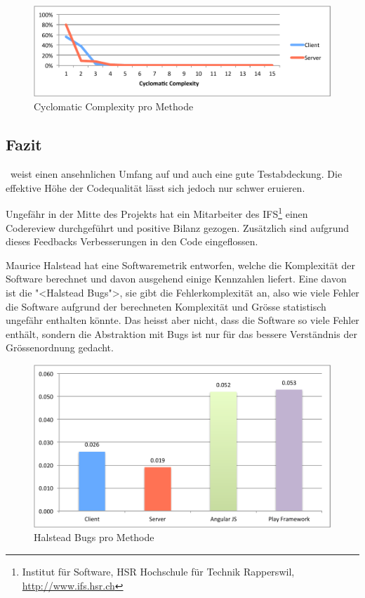 	
	\begin{figure}[H]
		\includegraphics[width=\textwidth]{projectPlan/media/img/methodComplexityCyclomaticComplexity.pdf}
		\centering
		\caption{Cyclomatic Complexity pro Methode}
		\label{fig:methodComplexityCyclomaticComplexity}
	\end{figure}
	
	
	\subsection{Fazit}
		\eeppi\ weist einen ansehnlichen Umfang auf und auch eine gute Testabdeckung.
		Die effektive Höhe  der Codequalität lässt sich jedoch nur schwer eruieren.	
		
		Ungefähr in der Mitte des Projekts hat ein Mitarbeiter des IFS\footnote{Institut für Software, HSR Hochschule für Technik Rapperswil, \url{http://www.ifs.hsr.ch}} einen Codereview durchgeführt und positive Bilanz gezogen.
		Zusätzlich sind aufgrund dieses Feedbacks Verbesserungen in den Code eingeflossen.
		
		Maurice Halstead hat eine Softwaremetrik entworfen,
		welche die Komplexität der Software berechnet und davon ausgehend einige Kennzahlen liefert.
		Eine davon ist die "<Halstead Bugs">, sie gibt die Fehlerkomplexität an,
		also wie viele Fehler die Software aufgrund der berechneten Komplexität und Grösse statistisch ungefähr enthalten könnte.
		Das heisst aber nicht, dass die Software so viele Fehler enthält,
		sondern die Abstraktion mit Bugs ist nur für das bessere Verständnis der Grössenordnung gedacht.
		
		\begin{figure}[H]
			\includegraphics[width=\textwidth]{projectPlan/media/img/halsteadBugsPerMethod.pdf}
			\centering
			\caption{Halstead Bugs pro Methode}
			\label{fig:halsteadBugsPerMethod}
		\end{figure}
		
